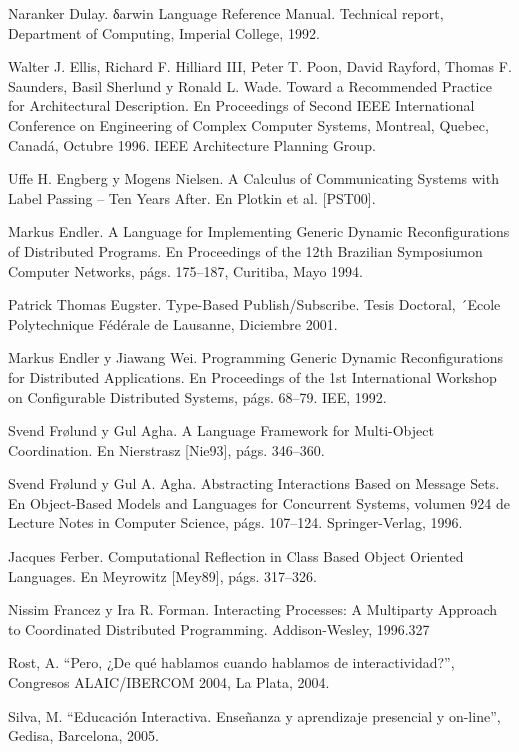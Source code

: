 \begin{thebibliography}{1}
{\bibitem{}
Naranker Dulay. δarwin Language Reference Manual. Technical report,
Department of Computing, Imperial College, 1992.


\bibitem{}
Walter J. Ellis, Richard F. Hilliard III, Peter T. Poon, David
Rayford, Thomas F. Saunders, Basil Sherlund y Ronald L. Wade. Toward a
Recommended Practice for Architectural Description. En Proceedings of Second
IEEE International Conference on Engineering of Complex Computer Systems,
Montreal, Quebec, Canadá, Octubre 1996. IEEE Architecture Planning Group.


\bibitem{}
Uffe H. Engberg y Mogens Nielsen. A Calculus of Communicating Systems
with Label Passing – Ten Years After. En Plotkin et al. [PST00].

\bibitem{} 
Markus Endler. A Language for Implementing Generic Dynamic
Reconfigurations of Distributed Programs. En Proceedings of the 12th Brazilian
Symposiumon Computer Networks, págs. 175–187, Curitiba, Mayo 1994.

\bibitem{}
Patrick Thomas Eugster. Type-Based Publish/Subscribe. Tesis Doctoral,
´Ecole Polytechnique Fédérale de Lausanne, Diciembre 2001.

\bibitem{}
Markus Endler y Jiawang Wei. Programming Generic Dynamic
Reconfigurations for Distributed Applications. En Proceedings of the 1st
International Workshop on Configurable Distributed Systems, págs. 68–79.
IEE, 1992.

\bibitem{} Svend Frølund y Gul Agha. A Language Framework for Multi-Object
Coordination. En Nierstrasz [Nie93], págs. 346–360.

\bibitem{} Svend Frølund y Gul A. Agha. Abstracting Interactions Based on
Message Sets. En Object-Based Models and Languages for Concurrent Systems,
volumen 924 de Lecture Notes in Computer Science, págs. 107–124.
Springer-Verlag, 1996.

\bibitem{} 
Jacques Ferber. Computational Reflection in Class Based Object Oriented
Languages. En Meyrowitz [Mey89], págs. 317–326.

\bibitem{}
Nissim Francez y Ira R. Forman. Interacting Processes: A Multiparty Approach to
Coordinated Distributed Programming. Addison-Wesley, 1996.327

Rost, A. “Pero, ¿De qué hablamos cuando hablamos de interactividad?”,
Congresos ALAIC/IBERCOM 2004, La Plata, 2004.

Silva, M. “Educación Interactiva. Enseñanza y aprendizaje presencial y
on-line”, Gedisa, Barcelona, 2005.


}
\end{thebibliography}
